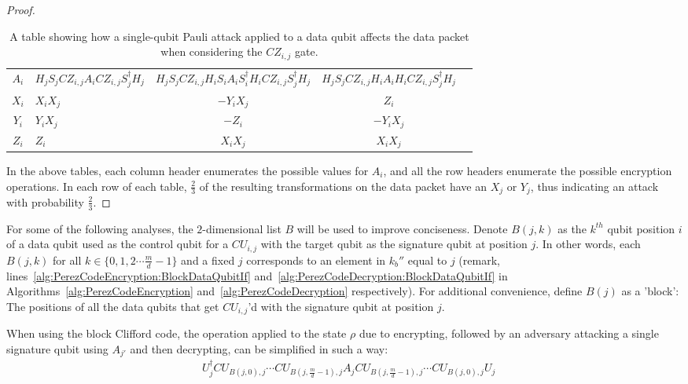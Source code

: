 \begin{proof}
\begin{table}[H]
\caption{A table showing how a single-qubit Pauli attack applied to a data qubit affects the data packet  when considering the $CZ_{i,j}$ gate. \label{table:dataQubitAttackTransformation3}}
\begin{adjustwidth}{-3.25cm}{-3.25cm} 
\begin{center}
\begin{tabular}{ |cV{4}c|c|c| }
\hline
$A_{i}$ & $H_jS_j\mathit{CZ}_{i,j}A_i\mathit{CZ}_{i,j}S_j^{\dagger}H_j$ & $H_jS_j\mathit{CZ}_{i,j}H_{i} S_{i}A_iS_i^{\dagger}H_i\mathit{CZ}_{i,j}S_j^{\dagger}H_j$ & $H_jS_j\mathit{CZ}_{i,j}H_iA_iH_i\mathit{CZ}_{i,j}S_j^{\dagger}H_j$\\
 $X_{i}$ & $X_iX_j$ & $-Y_iX_j$ & $Z_i$\\
\hline $Y_{i}$ & $Y_iX_j$ & $-Z_i$ & $-Y_iX_j$\\
\hline $Z_{i}$ & $Z_i$ & $X_iX_j$ & $X_iX_j$\\
\hline
\end{tabular}
\end{center}
\end{adjustwidth}
\end{table}
In the above tables, each column header enumerates the possible values for $A_i$, and all the row headers enumerate the possible encryption operations. In each row of each table, $\frac{2}{3}$ of the resulting transformations on the data packet have an $X_j$ or $Y_j$, thus indicating an attack with probability $\frac{2}{3}$.
\end{proof}
For some of the following analyses, the $2$-dimensional list $B$ will be used to improve conciseness. Denote $B(j,k)$ as the $k^{th}$ qubit position $i$ of a data qubit used as the control qubit for a $\mathit{CU}_{i,j}$ with the target qubit as the signature qubit at position $j$. In other words, each $B(j,k)$ for all $k \in \{0,1,2 \cdots \frac{m}{d} - 1\}$ and a fixed $j$ corresponds to an element in $k_b''$ equal to $j$ (remark, lines~\ref{alg:PerezCodeEncryption:BlockDataQubitIf} and~\ref{alg:PerezCodeDecryption:BlockDataQubitIf} in Algorithms~\ref{alg:PerezCodeEncryption} and~\ref{alg:PerezCodeDecryption} respectively). For additional convenience, define $B(j)$ as a 'block': The positions of all the data qubits that get $\mathit{CU}_{i,j}$'d with the signature qubit at position $j$.
\begin{myLemmarep}
\label{lemma:integrityEncryptionRearrangement2}
When using the block Clifford code, the operation applied to the state $\rho$ due to encrypting, followed by an adversary attacking a single signature qubit using $A_{j'}$ and then decrypting, can be simplified in such a way:
\begin{align}
&U_j^{\dagger}\mathit{CU}_{B(j,0),j} \cdots \mathit{CU}_{B(j,\frac{m}{d}-1),j} A_{j} \mathit{CU}_{B(j,\frac{m}{d}-1),j} \cdots \mathit{CU}_{B(j,0),j} U_j \label{eq:integrityEncryptionRearrangement2}
\end{align}
\end{myLemmarep}
